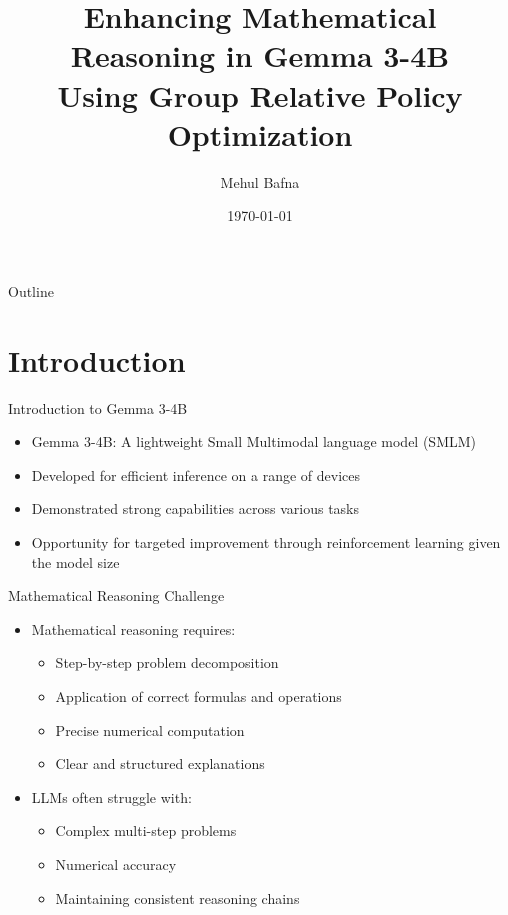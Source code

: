 \documentclass{beamer}
\title{Enhancing Mathematical Reasoning in Gemma 3-4B\\Using Group Relative Policy Optimization}
\author{Mehul Bafna}
\date{\today}
\institute{Yeshiva University}
\begin{document}
\begin{frame}
  \titlepage
\end{frame}

\begin{frame}{Outline}
  \tableofcontents
\end{frame}

\section{Introduction}

\begin{frame}{Introduction to Gemma 3-4B}
  \begin{itemize}
    \item Gemma 3-4B: A lightweight Small Multimodal language model (SMLM)
    \item Developed for efficient inference on a range of devices
    \item Demonstrated strong capabilities across various tasks
    \item Opportunity for targeted improvement through reinforcement learning given the model size
  \end{itemize}
\end{frame}

\begin{frame}{Mathematical Reasoning Challenge}
  \begin{itemize}
    \item Mathematical reasoning requires:
    \begin{itemize}
      \item Step-by-step problem decomposition
      \item Application of correct formulas and operations
      \item Precise numerical computation
      \item Clear and structured explanations
    \end{itemize}
    \item LLMs often struggle with:
    \begin{itemize}
      \item Complex multi-step problems
      \item Numerical accuracy
      \item Maintaining consistent reasoning chains
    \end{itemize}
  \end{itemize}
\end{frame}
\end{document}
